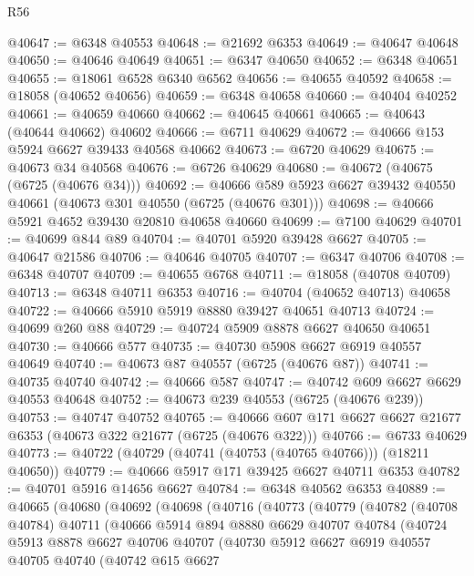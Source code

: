 \begin{lexlean}{R56}
\begin{coremodule}
@40647 := @6348 @40553
@40648 := @21692 @6353
@40649 := @40647 @40648
@40650 := @40646 @40649
@40651 := @6347 @40650
@40652 := @6348 @40651
@40655 := @18061 @6528 @6340 @6562
@40656 := @40655 @40592
@40658 := @18058 (@40652 @40656)
@40659 := @6348 @40658
@40660 := @40404 @40252
@40661 := @40659 @40660
@40662 := @40645 @40661
@40665 := @40643 (@40644 @40662) @40602
@40666 := @6711 @40629
@40672 := @40666 @153 @5924 @6627 @39433 @40568 @40662
@40673 := @6720 @40629
@40675 := @40673 @34 @40568
@40676 := @6726 @40629
@40680 := @40672 (@40675 (@6725 (@40676 @34)))
@40692 := @40666 @589 @5923 @6627 @39432 @40550 @40661 (@40673 @301 @40550 (@6725 (@40676 @301)))
@40698 := @40666 @5921 @4652 @39430 @20810 @40658 @40660
@40699 := @7100 @40629
@40701 := @40699 @844 @89
@40704 := @40701 @5920 @39428 @6627
@40705 := @40647 @21586
@40706 := @40646 @40705
@40707 := @6347 @40706
@40708 := @6348 @40707
@40709 := @40655 @6768
@40711 := @18058 (@40708 @40709)
@40713 := @6348 @40711 @6353
@40716 := @40704 (@40652 @40713) @40658
@40722 := @40666 @5910 @5919 @8880 @39427 @40651 @40713
@40724 := @40699 @260 @88
@40729 := @40724 @5909 @8878 @6627 @40650 @40651
@40730 := @40666 @577
@40735 := @40730 @5908 @6627 @6919 @40557 @40649
@40740 := @40673 @87 @40557 (@6725 (@40676 @87))
@40741 := @40735 @40740
@40742 := @40666 @587
@40747 := @40742 @609 @6627 @6629 @40553 @40648
@40752 := @40673 @239 @40553 (@6725 (@40676 @239))
@40753 := @40747 @40752
@40765 := @40666 @607 @171 @6627 @6627 @21677 @6353 (@40673 @322 @21677 (@6725 (@40676 @322)))
@40766 := @6733 @40629
@40773 := @40722 (@40729 (@40741 (@40753 (@40765 @40766))) (@18211 @40650))
@40779 := @40666 @5917 @171 @39425 @6627 @40711 @6353
@40782 := @40701 @5916 @14656 @6627
@40784 := @6348 @40562 @6353
@40889 := @40665
    (@40680
      (@40692
        (@40698
          (@40716
            (@40773
              (@40779
                (@40782
                  (@40708 @40784)
                  @40711
                  (@40666
                    @5914
                    @894
                    @8880
                    @6629
                    @40707
                    @40784
                    (@40724
                      @5913
                      @8878
                      @6627
                      @40706
                      @40707
                      (@40730
                        @5912
                        @6627
                        @6919
                        @40557
                        @40705
                        @40740
                        (@40742
                          @615
                          @6627

\end{coremodule}
\end{lexlean}
